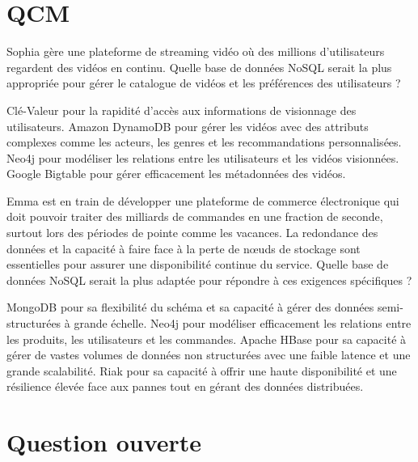 \documentclass[addpoints,answers]{exam}
\begin{document}
	
	\setcounter{page}{1}
	
	
	
	\begin{questions}
		
		\section*{QCM}
		
		\question[1] Sophia gère une plateforme de streaming vidéo où des millions d'utilisateurs regardent des vidéos en continu. Quelle base de données NoSQL serait la plus appropriée pour gérer le catalogue de vidéos et les préférences des utilisateurs ?
		\begin{checkboxes}
			\choice Clé-Valeur pour la rapidité d'accès aux informations de visionnage des utilisateurs.
			\CorrectChoice Amazon DynamoDB pour gérer les vidéos avec des attributs complexes comme les acteurs, les genres et les recommandations personnalisées.
			\choice Neo4j pour modéliser les relations entre les utilisateurs et les vidéos visionnées.
			\choice Google Bigtable pour gérer efficacement les métadonnées des vidéos.
		\end{checkboxes}
		
		\question[1] Emma est en train de développer une plateforme de commerce électronique qui doit pouvoir traiter des milliards de commandes en une fraction de seconde, surtout lors des périodes de pointe comme les vacances. La redondance des données et la capacité à faire face à la perte de nœuds de stockage sont essentielles pour assurer une disponibilité continue du service. Quelle base de données NoSQL serait la plus adaptée pour répondre à ces exigences spécifiques ?
		\begin{checkboxes}
			\choice MongoDB pour sa flexibilité du schéma et sa capacité à gérer des données semi-structurées à grande échelle.
			\choice Neo4j pour modéliser efficacement les relations entre les produits, les utilisateurs et les commandes.
			\CorrectChoice Apache HBase pour sa capacité à gérer de vastes volumes de données non structurées avec une faible latence et une grande scalabilité.
			\choice Riak pour sa capacité à offrir une haute disponibilité et une résilience élevée face aux pannes tout en gérant des données distribuées.
		\end{checkboxes}
		
		\section*{Question ouverte}
		
	\end{questions}
	
\end{document}
